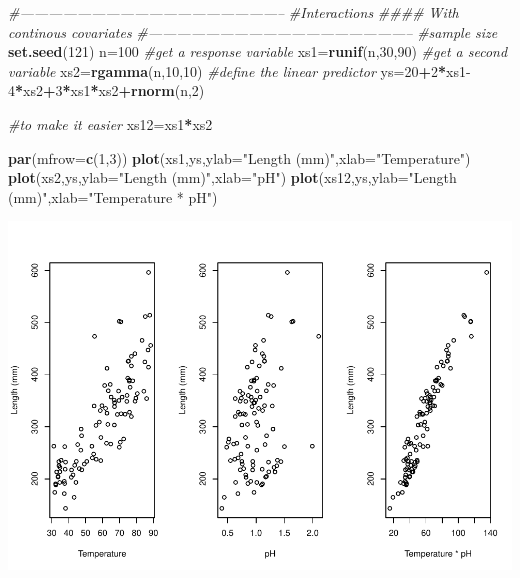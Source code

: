 \documentclass[
]{book}
\newenvironment{Shaded}{\begin{snugshade}}{\end{snugshade}}
\newcommand{\CommentTok}[1]{\textcolor[rgb]{0.56,0.35,0.01}{\textit{#1}}}
\newcommand{\DataTypeTok}[1]{\textcolor[rgb]{0.13,0.29,0.53}{#1}}
\newcommand{\DecValTok}[1]{\textcolor[rgb]{0.00,0.00,0.81}{#1}}
\newcommand{\KeywordTok}[1]{\textcolor[rgb]{0.13,0.29,0.53}{\textbf{#1}}}
\newcommand{\NormalTok}[1]{#1}
\newcommand{\OperatorTok}[1]{\textcolor[rgb]{0.81,0.36,0.00}{\textbf{#1}}}
\newcommand{\StringTok}[1]{\textcolor[rgb]{0.31,0.60,0.02}{#1}}
\begin{document}
\begin{Shaded}
\begin{Highlighting}[]
\CommentTok{#--------------------------------------------------------}
\CommentTok{#Interactions}
\CommentTok{#### With continous covariates}
\CommentTok{#--------------------------------------------------------}
\CommentTok{#sample size}
\KeywordTok{set.seed}\NormalTok{(}\DecValTok{121}\NormalTok{)}
\NormalTok{n=}\DecValTok{100}
\CommentTok{#get a response variable}
\NormalTok{xs1=}\KeywordTok{runif}\NormalTok{(n,}\DecValTok{30}\NormalTok{,}\DecValTok{90}\NormalTok{)}
\CommentTok{#get a second variable}
\NormalTok{xs2=}\KeywordTok{rgamma}\NormalTok{(n,}\DecValTok{10}\NormalTok{,}\DecValTok{10}\NormalTok{)}
\CommentTok{#define the linear predictor}
\NormalTok{ys=}\DecValTok{20}\OperatorTok{+}\DecValTok{2}\OperatorTok{*}\NormalTok{xs1}\DecValTok{-4}\OperatorTok{*}\NormalTok{xs2}\OperatorTok{+}\DecValTok{3}\OperatorTok{*}\NormalTok{xs1}\OperatorTok{*}\NormalTok{xs2}\OperatorTok{+}\KeywordTok{rnorm}\NormalTok{(n,}\DecValTok{2}\NormalTok{)}

\CommentTok{#to make it easier}
\NormalTok{xs12=xs1}\OperatorTok{*}\NormalTok{xs2}

\KeywordTok{par}\NormalTok{(}\DataTypeTok{mfrow=}\KeywordTok{c}\NormalTok{(}\DecValTok{1}\NormalTok{,}\DecValTok{3}\NormalTok{))}
\KeywordTok{plot}\NormalTok{(xs1,ys,}\DataTypeTok{ylab=}\StringTok{"Length (mm)"}\NormalTok{,}\DataTypeTok{xlab=}\StringTok{"Temperature"}\NormalTok{)}
\KeywordTok{plot}\NormalTok{(xs2,ys,}\DataTypeTok{ylab=}\StringTok{"Length (mm)"}\NormalTok{,}\DataTypeTok{xlab=}\StringTok{"pH"}\NormalTok{)}
\KeywordTok{plot}\NormalTok{(xs12,ys,}\DataTypeTok{ylab=}\StringTok{"Length (mm)"}\NormalTok{,}\DataTypeTok{xlab=}\StringTok{"Temperature * pH"}\NormalTok{)}
\end{Highlighting}
\end{Shaded}

\includegraphics{ECOMODbook_files/figure-latex/a12.1-1.pdf}
\end{document}
